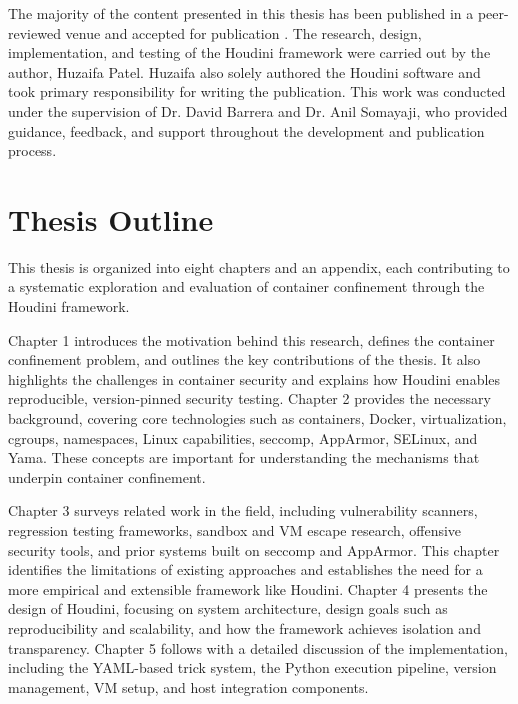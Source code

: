 \documentclass[12pt]{report}
\begin{document}
\begin{doublespace}
The majority of the content presented in this thesis has been published in a peer-reviewed venue and accepted for publication \cite{houdini}. The research, design, implementation, and testing of the Houdini framework were carried out by the author, Huzaifa Patel. Huzaifa also solely authored the Houdini software and took primary responsibility for writing the publication. This work was conducted under the supervision of Dr. David Barrera and Dr. Anil Somayaji, who provided guidance, feedback, and support throughout the development and publication process.

\section{Thesis Outline}

This thesis is organized into eight chapters and an appendix, each contributing to a systematic exploration and evaluation of container confinement through the Houdini framework. 

Chapter 1 introduces the motivation behind this research, defines the container confinement problem, and outlines the key contributions of the thesis. It also highlights the challenges in container security and explains how Houdini enables reproducible, version-pinned security testing. Chapter 2 provides the necessary background, covering core technologies such as containers, Docker, virtualization, cgroups, namespaces, Linux capabilities, seccomp, AppArmor, SELinux, and Yama. These concepts are important for understanding the mechanisms that underpin container confinement.

Chapter 3 surveys related work in the field, including vulnerability scanners, regression testing frameworks, sandbox and VM escape research, offensive security tools, and prior systems built on seccomp and AppArmor. This chapter identifies the limitations of existing approaches and establishes the need for a more empirical and extensible framework like Houdini. Chapter 4 presents the design of Houdini, focusing on system architecture, design goals such as reproducibility and scalability, and how the framework achieves isolation and transparency. Chapter 5 follows with a detailed discussion of the implementation, including the YAML-based trick system, the Python execution pipeline, version management, VM setup, and host integration components.


\end{doublespace}
\end{document}
